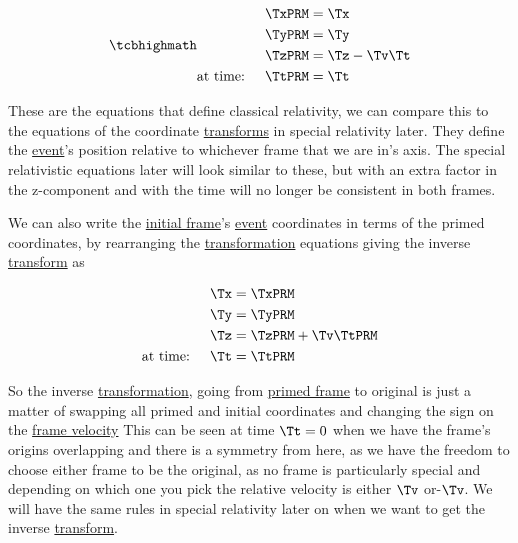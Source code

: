 \begin{equation}
	\mhl{
		\begin{aligned}
			 & {\TxPRM  } = {\Tx }        \\
			 & {\TyPRM  } = {\Ty }        \\
			 & {\TzPRM  } = {\Tz }-{\Tv }{\Tt } \\
			\text{at time: }\quad&  \TtPRM  = {\Tt }
		\end{aligned}
	}
	\label{eq: Galilean transformation}
\end{equation}

These are the equations that define classical relativity, we can compare this to the equations of the coordinate \hyperlink{def-transform}{transforms} in special relativity later. They define the \hyperlink{def-event}{event}'s position relative to whichever frame that we are in's axis. The special relativistic equations later will look similar to these, but with an extra factor in the z-component and with the time will no longer be consistent in both frames.

We can also write the \hyperlink{def-initial-Frame}{initial frame}'s \hyperlink{def-event}{event} coordinates in terms of the primed coordinates, by rearranging the \hyperlink{def-transform}{transformation} equations giving the inverse \hyperlink{def-transform}{transform} as

\begin{equation}
	\begin{aligned}
		 & {\Tx } = {\TxPRM  }             \\
		 & {\Ty } = {\TyPRM  }             \\
		 & {\Tz } = {\TzPRM  } + {\Tv }\TtPRM  \\
		\text{at time: }\quad&  {\Tt } = \TtPRM
	\end{aligned}
	\label{eq: Inverse Galilean transformation}
\end{equation}

So the inverse \hyperlink{def-transform}{transformation}, going from \hyperlink{def-Primed-Frame}{primed frame} to original is just a matter of swapping all primed and initial coordinates and changing the sign on the \hyperlink{def-frame-velocity}{frame velocity}
This can be seen at time ${\Tt } = 0$ when we have the frame's origins overlapping and there is a symmetry from here, as we have the freedom to choose either frame to be the original, as no frame is particularly special and depending on which one you pick the relative velocity is either ${\Tv }$ or-${\Tv }$. We will have the same rules in special relativity later on when we want to get the inverse \hyperlink{def-transform}{transform}.

